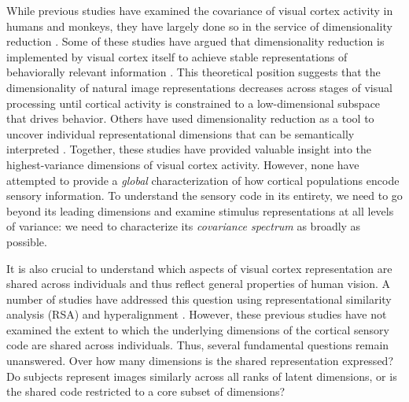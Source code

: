 \documentclass[10pt]{article}
\begin{document}
While previous studies have examined the covariance of visual cortex activity in humans and monkeys, they have largely done so in the service of dimensionality reduction \autocite{Khosla2022,Tarhan2020,Haxby2011,Huth2012}. Some of these studies have argued that dimensionality reduction is implemented by visual cortex itself to achieve stable representations of behaviorally relevant information \autocite{Lehky2014,Lehky2016,Fusi2016}. This theoretical position suggests that the dimensionality of natural image representations decreases across stages of visual processing until cortical activity is constrained to a low-dimensional subspace that drives behavior. Others have used dimensionality reduction as a tool to uncover individual representational dimensions that can be semantically interpreted \autocite{Thorat2019,Connolly2012,Huth2012,Khosla2022}. Together, these studies have provided valuable insight into the highest-variance dimensions of visual cortex activity. However, none have attempted to provide a \emph{global} characterization of how cortical populations encode sensory information. To understand the sensory code in its entirety, we need to go beyond its leading dimensions and examine stimulus representations at all levels of variance: we need to characterize its \emph{covariance spectrum} as broadly as possible.

It is also crucial to understand which aspects of visual cortex representation are shared across individuals and thus reflect general properties of human vision. A number of studies have addressed this question using representational similarity analysis (RSA) and hyperalignment \autocite{Kriegeskorte2008,Haxby2011,Haxby2020}. However, these previous studies have not examined the extent to which the underlying dimensions of the cortical sensory code are shared across individuals. Thus, several fundamental questions remain unanswered. Over how many dimensions is the shared representation expressed? Do subjects represent images similarly across all ranks of latent dimensions, or is the shared code restricted to a core subset of dimensions?
\end{document}
